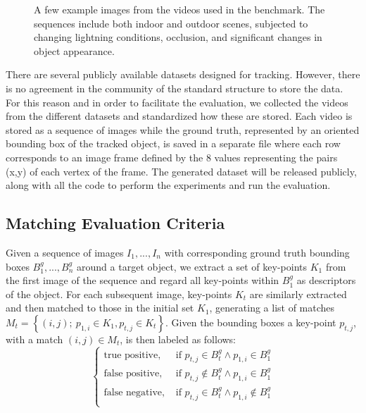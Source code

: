 \begin{figure}[t]
{	
	}
\caption{A few example images from the videos used in the benchmark. The sequences include both indoor and outdoor scenes, subjected to changing lightning conditions, 
occlusion, and significant changes in object appearance.}
\vspace{-3mm}
\label{fig:tracking_results}
\end{figure}


There are several publicly available datasets designed for tracking. However, there is no agreement in the community of the standard structure to store the data. For this reason and in order to facilitate the evaluation, we collected the videos from the different datasets and standardized how these are stored. Each video is stored as a sequence of images while the ground truth, represented by an oriented bounding box of the tracked object, is saved in a separate file where each row corresponds to an image frame defined by the 8 values representing the pairs (x,y) of each vertex of the frame. The generated dataset will be released publicly, along with all the code to perform the experiments and run the evaluation.

\subsection{Matching Evaluation Criteria}
Given a sequence of images $I_{1},...,I_{n}$ with corresponding ground truth bounding boxes $B^g_{1},...,B^g_{n}$ around a target object, we extract a set of key-points $K_1$ from the first image of the sequence and regard all key-points within $B^g_{1}$ as descriptors of the object. For each subsequent image, key-points $K_{t}$ are similarly extracted and then matched to those in the initial set $K_{1}$, generating a list of matches $M_t = \left\lbrace (i,j); ~p_{1,i} \in K_1, p_{t,j} \in K_t \right\rbrace$. Given the bounding boxes a key-point $p_{t,j}$, with a match $(i,j)\in M_t$, is then labeled as follows:
\begin{equation}
\begin{cases}
\text{true positive},&  \text{ if } p_{t,j} \in B^g_{t} \land p_{1,i} \in B^g_{1} \\
\text{false positive},&  \text{ if } p_{t,j} \notin B^g_{t} \land p_{1,i} \in B^g_{1} \\
\text{false negative},&  \text{ if } p_{t,j} \in B^g_{t} \land p_{1,i} \notin B^g_{1} \\
\end{cases}
\end{equation}

